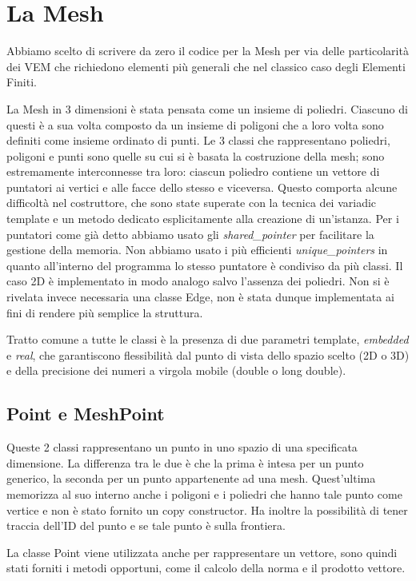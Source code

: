 \documentclass[oneside,12pt]{book}  %
\theoremstyle{plain}
\theoremstyle{definition}
\theoremstyle{remark}
\numberwithin{equation}{chapter} %
\begin{document}
\section{La Mesh}
\label{sec:mesh}
Abbiamo scelto di scrivere da zero il codice per la Mesh per via delle
particolarit\`a dei VEM che richiedono elementi pi\`u generali che nel
classico caso degli Elementi Finiti. 

La Mesh in 3 dimensioni \`e stata pensata come un insieme di
poliedri. Ciascuno di questi \`e a sua volta composto da un insieme di
poligoni che a loro volta sono definiti come insieme ordinato
di punti. Le 3 classi che rappresentano poliedri, poligoni e punti
sono quelle su cui si \`e basata la costruzione della mesh; sono
estremamente interconnesse tra loro: ciascun poliedro contiene
un vettore di puntatori ai vertici e alle facce dello stesso e viceversa. Questo
comporta alcune difficolt\`a nel costruttore, che sono state superate
con la tecnica dei variadic template e un metodo dedicato
esplicitamente alla creazione di un'istanza. Per i puntatori come
gi\`a detto abbiamo usato gli \textit{shared\_pointer} per facilitare
la gestione della memoria. 
Non abbiamo usato i pi\`u efficienti \textit{unique\_pointers}
in quanto all'interno del programma lo stesso puntatore \`e condiviso
da pi\`u classi.
Il caso 2D \`e implementato in modo analogo salvo l'assenza dei
poliedri. Non si \`e rivelata invece necessaria una classe Edge, non
\`e stata dunque implementata ai fini di rendere pi\`u semplice la struttura.

Tratto comune a tutte le classi
\`e la presenza di due parametri template, \textit{embedded} e
\textit{real}, che garantiscono flessibilit\`a dal punto di vista
dello spazio scelto (2D o 3D) e della precisione dei numeri a virgola
mobile (double o long double). 

\subsection{Point e MeshPoint}
Queste 2 classi rappresentano un punto in uno spazio di una
specificata dimensione. La differenza tra le due \`e che la prima \`e
intesa per un punto generico, la seconda per un punto appartenente ad
una mesh. Quest'ultima memorizza al suo interno anche i poligoni e i
poliedri che hanno tale punto come vertice e non \`e stato fornito un
copy constructor. Ha inoltre la possibilit\`a di tener traccia dell'ID
del punto e se tale punto \`e sulla frontiera.

La classe Point viene utilizzata anche per rappresentare un vettore,
sono quindi stati forniti i metodi opportuni, come il calcolo della
norma e il prodotto vettore. 
\end{document}
